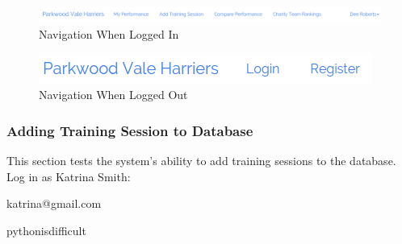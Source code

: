 \documentclass{article}[12pt,a4paper]
\begin{document}
\begin{figure}[h!]
    \includegraphics[scale=0.33]{images/testing/navigation/logged_in}
    \caption{Navigation When Logged In}
\end{figure}

\begin{figure}[h!]
    \includegraphics[scale=0.40]{images/testing/navigation/logged_out}
    \caption{Navigation When Logged Out}
\end{figure}

\clearpage


\subsubsection{Adding Training Session to Database}
This section tests the system's ability to add training sessions to the database. Log in as Katrina Smith:
\begin{description}[labelindent=1cm]
  \item[Email address:] katrina@gmail.com
  \item[Password:] pythonisdifficult
\end{description}
\end{document}
